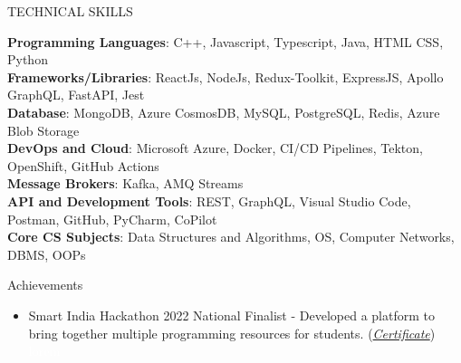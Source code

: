\documentclass{resume} %
\newcommand\invisible[1]{\textcolor{white}{\fontsize{0pt}{0}#1}}
\begin{document}
\begin{rSection}{TECHNICAL SKILLS}




\textbf{Programming Languages}: {\normalfont C++, Javascript, Typescript, Java, HTML CSS, Python}
\\
\textbf{Frameworks/Libraries}: {\normalfont ReactJs, NodeJs, Redux-Toolkit, ExpressJS, Apollo GraphQL, FastAPI, Jest}
 \\
 \textbf{Database}: {\normalfont MongoDB, Azure CosmosDB, MySQL, PostgreSQL, Redis, Azure Blob Storage}
 \\
 \textbf{DevOps and Cloud}: {\normalfont Microsoft Azure, Docker, CI/CD Pipelines, Tekton, OpenShift, GitHub Actions}
 \\
 \textbf{Message Brokers}: {\normalfont Kafka, AMQ Streams}  
 \\
 \textbf{API and Development Tools}: {\normalfont REST, GraphQL, Visual Studio Code, Postman, GitHub, PyCharm, CoPilot}
\\ \textbf{Core CS Subjects}: {\normalfont Data Structures and Algorithms, OS, Computer Networks, DBMS, OOPs}
\end{rSection}


\begin{rSection}{Achievements}

\begin{itemize}
   \item {Smart India Hackathon 2022 National Finalist} - {\normalfont Developed a platform to bring together multiple programming resources for students. }{\normalfont (\href{https://drive.google.com/file/d/1No-u1sUaclG-nf7_Gtym5JDEz1ydyRSL/view?usp=sharing}{\emph{Certificate}})}
   {\invisible{lorem}}

\end{itemize}
\end{rSection}





\end{document}
